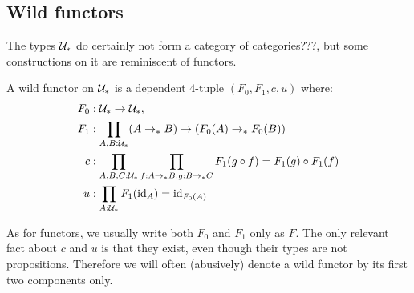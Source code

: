 \documentclass[english,a4]{article}
\newcommand{\ptdto}{\to_\ast}%
\newcommand{\UUptd}{\UU_{\ast}}
\begin{document}
\subsection{Wild functors}
\label{sec:wild-functors}
The types $\UUptd$ do certainly not form a category {\color{red} of categories???}, 
but some constructions on it are reminiscent of functors. 
\begin{definition}
  A wild functor on $\UUptd$ is a dependent $4$-tuple $(F_0,F_1,c,u)$ where:
  \begin{align*}
    F_0 &:\UUptd \to \UUptd,\\
    F_1 &:\prod_{A,B:\UUptd} (A \ptdto B) \to (F_0(A) \ptdto F_0(B))\\
    c &: \prod_{A,B,C:\UUptd}\prod_{f:A\ptdto B, g:B\ptdto C}F_1(g\circ f) = F_1(g) \circ F_1(f)\\
    u &: \prod_{A:\UUptd} F_1(\id_A) = \id_{F_0(A)}
  \end{align*}
  \label{def:wild-functor}
\end{definition}

As for functors, we usually write both $F_0$ and $ F_1$ only as $F$. The only
relevant fact about $c$ and $u$ is that they exist, 
{\color{red} even though their types are not propositions}. 
Therefore we will often (abusively)
denote a wild functor by its first two components only.
\end{document}
